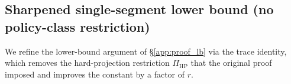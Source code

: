 %
%
%
%
%


\subsection{Sharpened single-segment lower bound (no policy-class restriction)}
\label{app:proof_lb_sharp}

We refine the lower-bound argument of \S\ref{app:proof_lb} via the
trace identity, which removes the hard-projection restriction
$\Pi_{\mathrm{HP}}$ that the original proof imposed and improves the
constant by a factor of $r$.

